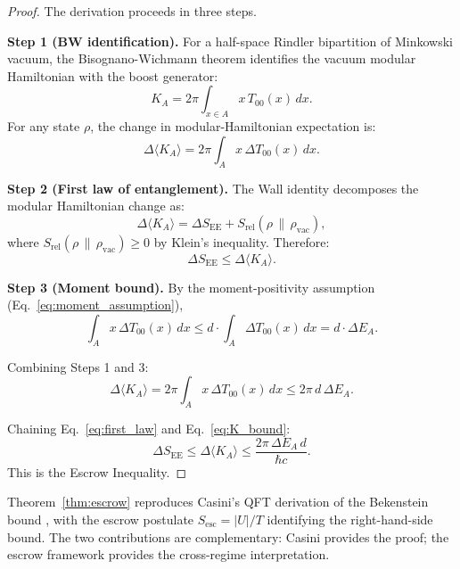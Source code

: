 \documentclass[11pt]{article}
\begin{document}
\begin{proof}
The derivation proceeds in three steps.

\textbf{Step 1 (BW identification).} For a half-space Rindler bipartition of Minkowski vacuum, the Bisognano-Wichmann theorem identifies the vacuum modular Hamiltonian with the boost generator:
\begin{equation}
K_A = 2\pi \int_{x \in A} x \, T_{00}(x) \, dx.
\end{equation}
For any state $\rho$, the change in modular-Hamiltonian expectation is:
\begin{equation}
\Delta\langle K_A\rangle = 2\pi \int_A x \, \Delta T_{00}(x) \, dx.
\label{eq:BW_change}
\end{equation}

\textbf{Step 2 (First law of entanglement).} The Wall identity \cite{Wall2011} decomposes the modular Hamiltonian change as:
\begin{equation}
\Delta\langle K_A\rangle = \Delta S_{\mathrm{EE}} + S_{\mathrm{rel}}(\rho \,\|\, \rho_{\mathrm{vac}}),
\end{equation}
where $S_{\mathrm{rel}}(\rho \,\|\, \rho_{\mathrm{vac}}) \geq 0$ by Klein's inequality. Therefore:
\begin{equation}
\Delta S_{\mathrm{EE}} \leq \Delta\langle K_A\rangle.
\label{eq:first_law}
\end{equation}

\textbf{Step 3 (Moment bound).} By the moment-positivity assumption (Eq.~\ref{eq:moment_assumption}),
\begin{equation}
\int_A x \, \Delta T_{00}(x) \, dx \leq d \cdot \int_A \Delta T_{00}(x) \, dx = d \cdot \Delta E_A.
\label{eq:moment}
\end{equation}

Combining Steps 1 and 3:
\begin{equation}
\Delta\langle K_A\rangle = 2\pi \int_A x \, \Delta T_{00}(x) \, dx \leq 2\pi \, d \, \Delta E_A.
\label{eq:K_bound}
\end{equation}

Chaining Eq.~\ref{eq:first_law} and Eq.~\ref{eq:K_bound}:
\begin{equation}
\Delta S_{\mathrm{EE}} \leq \Delta\langle K_A\rangle \leq \frac{2\pi \, \Delta E_A \, d}{\hbar c}.
\end{equation}
This is the Escrow Inequality.
\end{proof}

\begin{remark}
Theorem~\ref{thm:escrow} reproduces Casini's QFT derivation of the Bekenstein bound \cite{Casini2008}, with the escrow postulate $S_{\mathrm{esc}} = |U|/T$ identifying the right-hand-side bound. The two contributions are complementary: Casini provides the proof; the escrow framework provides the cross-regime interpretation.
\end{remark}
\end{document}
